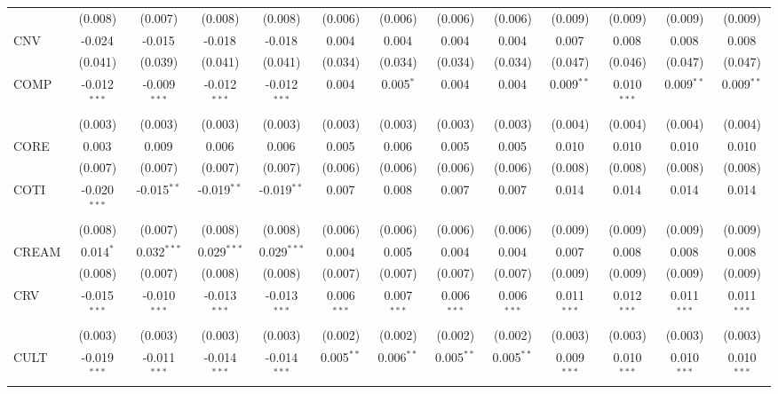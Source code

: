 \begin{table}[!htbp]
\begin{tabular}{@{\extracolsep{5pt}}lcccccccccccc}
  & (0.008) & (0.007) & (0.008) & (0.008) & (0.006) & (0.006) & (0.006) & (0.006) & (0.009) & (0.009) & (0.009) & (0.009) \\
 CNV & -0.024$^{}$ & -0.015$^{}$ & -0.018$^{}$ & -0.018$^{}$ & 0.004$^{}$ & 0.004$^{}$ & 0.004$^{}$ & 0.004$^{}$ & 0.007$^{}$ & 0.008$^{}$ & 0.008$^{}$ & 0.008$^{}$ \\
  & (0.041) & (0.039) & (0.041) & (0.041) & (0.034) & (0.034) & (0.034) & (0.034) & (0.047) & (0.046) & (0.047) & (0.047) \\
 COMP & -0.012$^{***}$ & -0.009$^{***}$ & -0.012$^{***}$ & -0.012$^{***}$ & 0.004$^{}$ & 0.005$^{*}$ & 0.004$^{}$ & 0.004$^{}$ & 0.009$^{**}$ & 0.010$^{***}$ & 0.009$^{**}$ & 0.009$^{**}$ \\
  & (0.003) & (0.003) & (0.003) & (0.003) & (0.003) & (0.003) & (0.003) & (0.003) & (0.004) & (0.004) & (0.004) & (0.004) \\
 CORE & 0.003$^{}$ & 0.009$^{}$ & 0.006$^{}$ & 0.006$^{}$ & 0.005$^{}$ & 0.006$^{}$ & 0.005$^{}$ & 0.005$^{}$ & 0.010$^{}$ & 0.010$^{}$ & 0.010$^{}$ & 0.010$^{}$ \\
  & (0.007) & (0.007) & (0.007) & (0.007) & (0.006) & (0.006) & (0.006) & (0.006) & (0.008) & (0.008) & (0.008) & (0.008) \\
 COTI & -0.020$^{***}$ & -0.015$^{**}$ & -0.019$^{**}$ & -0.019$^{**}$ & 0.007$^{}$ & 0.008$^{}$ & 0.007$^{}$ & 0.007$^{}$ & 0.014$^{}$ & 0.014$^{}$ & 0.014$^{}$ & 0.014$^{}$ \\
  & (0.008) & (0.007) & (0.008) & (0.008) & (0.006) & (0.006) & (0.006) & (0.006) & (0.009) & (0.009) & (0.009) & (0.009) \\
 CREAM & 0.014$^{*}$ & 0.032$^{***}$ & 0.029$^{***}$ & 0.029$^{***}$ & 0.004$^{}$ & 0.005$^{}$ & 0.004$^{}$ & 0.004$^{}$ & 0.007$^{}$ & 0.008$^{}$ & 0.008$^{}$ & 0.008$^{}$ \\
  & (0.008) & (0.007) & (0.008) & (0.008) & (0.007) & (0.007) & (0.007) & (0.007) & (0.009) & (0.009) & (0.009) & (0.009) \\
 CRV & -0.015$^{***}$ & -0.010$^{***}$ & -0.013$^{***}$ & -0.013$^{***}$ & 0.006$^{***}$ & 0.007$^{***}$ & 0.006$^{***}$ & 0.006$^{***}$ & 0.011$^{***}$ & 0.012$^{***}$ & 0.011$^{***}$ & 0.011$^{***}$ \\
  & (0.003) & (0.003) & (0.003) & (0.003) & (0.002) & (0.002) & (0.002) & (0.002) & (0.003) & (0.003) & (0.003) & (0.003) \\
 CULT & -0.019$^{***}$ & -0.011$^{***}$ & -0.014$^{***}$ & -0.014$^{***}$ & 0.005$^{**}$ & 0.006$^{**}$ & 0.005$^{**}$ & 0.005$^{**}$ & 0.009$^{***}$ & 0.010$^{***}$ & 0.010$^{***}$ & 0.010$^{***}$ \\

\end{tabular}
\end{table}
